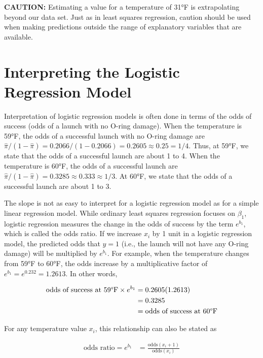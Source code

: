\documentclass[
]{report}
\begin{document}
\large

\textbf{CAUTION:} Estimating a value for a temperature of 31°F is extrapolating beyond our data set. Just as in least squares regression, caution should be used when making predictions outside the range of explanatory variables that are available.
\normalsize

\hypertarget{interpreting-the-logistic-regression-model}{%
\section{\texorpdfstring{\textbf{Interpreting the Logistic Regression Model}}{Interpreting the Logistic Regression Model}}\label{interpreting-the-logistic-regression-model}}

Interpretation of logistic regression models is often done in terms of the odds of success (odds of a launch with no O-ring damage). When the temperature is 59°F, the odds of a successful launch with no O-ring damage are \(\hat\pi/(1 - \hat\pi) = 0.2066/(1 - 0.2066) = 0.2605 \approx 0.25 = 1/4\). Thus, at 59°F, we state that the odds of a successful launch are about 1 to 4. When the temperature is 60°F, the odds of a successful launch are \(\hat\pi/(1 - \hat\pi) = 0.3285 \approx 0.333 \approx 1/3\). At 60°F, we state that the odds of a successful launch are about 1 to 3.

The slope is not as easy to interpret for a logistic regression model as for a simple linear regression model. While ordinary least squares regression focuses on \(\beta_1\), logistic regression measures the change in the odds of success by the term \(e^{b_1}\), which is called the odds ratio. If we increase \(x_i\) by 1 unit in a logistic regression model, the predicted odds that \(y = 1\) (i.e., the launch will not have any O-ring damage) will be multiplied by \(e^{b_1}\). For example, when the temperature changes from 59°F to 60°F, the odds increase by a multiplicative factor of \(e^{b_1} = e^{0.232} = 1.2613\). In other words,

\begin{align}
\text{odds of success at 59°F} \times e^{b_1} 
&= 0.2605(1.2613) \notag \\
&= 0.3285 \notag \\
&= \text{odds of success at 60°F} \notag
\end{align}

For any temperature value \(x_i\), this relationship can also be stated as

\begin{align}
\text{odds ratio} = e^{b_1} &= \frac{\text{odds}(x_i + 1)}{\text{odds}(x_i)} \tag{6.10}
\end{align}
\end{document}
